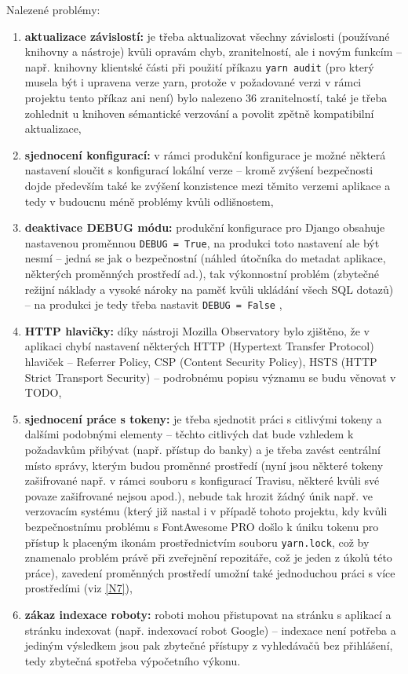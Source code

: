 Nalezené problémy:
\begin{enumerate}[label=\textbf{B\arabic*}]
    \item \label{B1} \textbf{aktualizace závislostí:} je třeba aktualizovat všechny závislosti (používané knihovny a nástroje) kvůli opravám chyb, zranitelností, ale i novým funkcím -- např. knihovny klientské části při použití příkazu \verb|yarn audit| (pro který musela být i upravena verze yarn, protože v požadované verzi v rámci projektu tento příkaz ani není) bylo nalezeno 36 zranitelností, také je třeba zohlednit u knihoven sémantické verzování a povolit zpětně kompatibilní aktualizace,
    \item \label{B2} \textbf{sjednocení konfigurací:} v rámci produkční konfigurace je možné některá nastavení sloučit s konfigurací lokální verze -- kromě zvýšení bezpečnosti dojde především také ke zvýšení konzistence mezi těmito verzemi aplikace a tedy v budoucnu méně problémy kvůli odlišnostem,
    \item \label{B3} \textbf{deaktivace DEBUG módu:} produkční konfigurace pro 
    Django obsahuje nastavenou proměnnou \verb|DEBUG = True|, na produkci toto nastavení ale být nesmí -- jedná se jak o bezpečnostní (náhled útočníka do metadat aplikace, některých proměnných prostředí ad.), tak výkonnostní problém (zbytečné režijní náklady a vysoké nároky na paměť kvůli ukládání všech SQL dotazů) -- na produkci je tedy třeba nastavit \verb|DEBUG = False| \cite{django-debug},
    \item \label{B4} \textbf{HTTP hlavičky:} díky nástroji Mozilla Observatory bylo zjištěno, že v aplikaci chybí nastavení některých HTTP (Hypertext Transfer Protocol) hlaviček -- Referrer Policy, CSP (Content Security Policy), HSTS (HTTP Strict Transport Security) -- podrobnému popisu významu se budu věnovat v TODO,
    \item \label{B5} \textbf{sjednocení práce s tokeny:} je třeba sjednotit práci s citlivými tokeny a dalšími podobnými elementy -- těchto citlivých dat bude vzhledem k požadavkům přibývat (např. přístup do banky) a je třeba zavést centrální místo správy, kterým budou proměnné prostředí (nyní jsou některé tokeny zašifrované např. v rámci souboru s konfigurací Travisu, některé kvůli své povaze zašifrované nejsou apod.), nebude tak hrozit žádný únik např. ve verzovacím systému (který již nastal i v případě tohoto projektu, kdy kvůli bezpečnostnímu problému s FontAwesome PRO \cite{fontawesome-token} došlo k úniku tokenu pro přístup k placeným ikonám prostřednictvím souboru \verb|yarn.lock|, což by znamenalo problém právě při zveřejnění repozitáře, což je jeden z úkolů této práce), zavedení proměnných prostředí umožní také jednoduchou práci s více prostředími (viz \ref{N7}),
    \item \label{B6} \textbf{zákaz indexace roboty:} roboti mohou přistupovat na stránku s aplikací a stránku indexovat (např. indexovací robot Google) -- indexace není potřeba a jediným výsledkem jsou pak zbytečné přístupy z vyhledávačů bez přihlášení, tedy zbytečná spotřeba výpočetního výkonu.
\end{enumerate}


